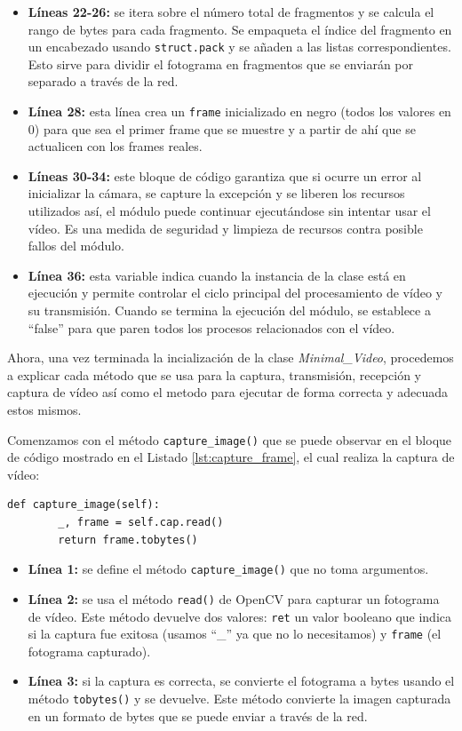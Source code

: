 \begin{itemize}
    \item \textbf{Líneas 22-26:} se itera sobre el número total de fragmentos y se calcula el rango de bytes para cada fragmento. Se empaqueta el índice del fragmento en un encabezado usando \texttt{struct.pack} y se añaden a las listas correspondientes. Esto sirve para dividir el fotograma en fragmentos que se enviarán por separado a través de la red.
    \item \textbf{Línea 28:} esta línea crea un \texttt{frame} inicializado en negro (todos los valores en 0) para que sea el primer frame que se muestre y a partir de ahí que se actualicen con los frames reales.
    \item \textbf{Líneas 30-34:} este bloque de código garantiza que si ocurre un error al inicializar la cámara, se capture la excepción y se liberen los recursos utilizados así, el módulo puede continuar ejecutándose sin intentar usar el vídeo. Es una medida de seguridad y limpieza de recursos contra posible fallos del módulo.
    \item \textbf{Línea 36:} esta variable indica cuando la instancia de la clase está en ejecución y permite controlar el ciclo principal del procesamiento de vídeo y su transmisión. Cuando se termina la ejecución del módulo, se establece a ``false'' para que paren todos los procesos relacionados con el vídeo.
\end{itemize}

Ahora, una vez terminada la incialización de la clase \textit{Minimal\_Video}, procedemos a explicar cada método que se usa para la captura, transmisión, recepción y captura de vídeo así como el metodo para ejecutar de forma correcta y adecuada estos mismos.
\vspace{\baselineskip}

Comenzamos con el método \texttt{capture\_image()} que se puede observar en el bloque de código mostrado en el Listado \ref{lst:capture_frame}, el cual realiza la captura de vídeo:
\begin{lstlisting}[style=pythonstyle, caption={Método \texttt{capture\_frame()} de \textit{Minimal\_Video}.}, label={lst:capture_frame}]
def capture_image(self):
        _, frame = self.cap.read()
        return frame.tobytes()
\end{lstlisting}

\begin{itemize}
    \item \textbf{Línea 1:} se define el método \texttt{capture\_image()} que no toma argumentos.
    \item \textbf{Línea 2:} se usa el método \texttt{read()} de OpenCV para capturar un fotograma de vídeo. Este método devuelve dos valores: \texttt{ret} un valor booleano que indica si la captura fue exitosa (usamos ``\_'' ya que no lo necesitamos) y \texttt{frame} (el fotograma capturado).
    \item \textbf{Línea 3:} si la captura es correcta, se convierte el fotograma a bytes usando el método \texttt{tobytes()} y se devuelve. Este método convierte la imagen capturada en un formato de bytes que se puede enviar a través de la red.
\end{itemize}
\vspace{\baselineskip}

